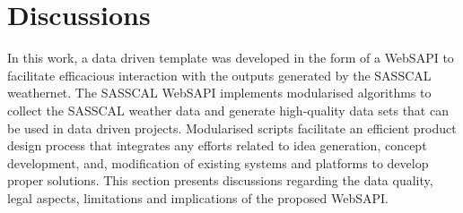 \documentclass[a4paper, 10pt, conference]{ieeeconf}      %
\begin{document}
\section{\textbf{Discussions}}
\label{Discus}
\noindent
In this work, a data driven template   was developed in the form of a WebSAPI to facilitate efficacious interaction with the outputs generated by the SASSCAL weathernet.
The SASSCAL WebSAPI implements   modularised  algorithms  to collect the SASSCAL weather data and generate high-quality data sets that can be used in data driven projects. 
Modularised scripts facilitate an efficient product design process that integrates any  efforts related to  idea generation, concept development, and, modification of existing systems and platforms to develop proper solutions.
%
This section %
presents   discussions regarding the data quality, legal aspects, limitations and implications of   the  proposed  WebSAPI. 
%

\end{document}
